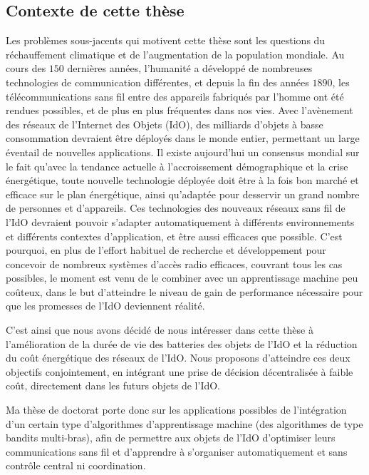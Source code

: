 \begin{resume_fr}
\section*{Contexte de cette thèse}


%
Les problèmes sous-jacents qui motivent cette thèse sont les questions du réchauffement climatique et de l'augmentation de la population mondiale.
Au cours des $150$ dernières années, l'humanité a développé de nombreuses technologies de communication différentes, et depuis la fin des années $1890$, les télécommunications sans fil entre des appareils fabriqués par l'homme ont été rendues possibles, et de plus en plus fréquentes dans nos vies.
Avec l'avènement des réseaux de l'Internet des Objets (IdO), des milliards d'objets à basse consommation devraient être déployés dans le monde entier, permettant un large éventail de nouvelles applications.
Il existe aujourd'hui un consensus mondial sur le fait qu'avec la tendance actuelle à l'accroissement démographique et la crise énergétique, toute nouvelle technologie déployée doit être à la fois bon marché et efficace sur le plan énergétique,
ainsi qu'adaptée pour desservir un grand nombre de personnes et d'appareils.
%
Ces technologies des nouveaux réseaux sans fil de l'IdO devraient pouvoir s'adapter automatiquement à différents environnements et différents contextes d'application, et être aussi efficaces que possible.
%
C'est pourquoi, en plus de l'effort habituel de recherche et développement pour concevoir de nombreux systèmes d'accès radio efficaces, couvrant tous les cas possibles,
le moment est venu de le combiner avec un apprentissage machine peu coûteux, dans le but d'atteindre le niveau de gain de performance nécessaire pour que les promesses de l'IdO deviennent réalité.


C'est ainsi que nous avons décidé de nous intéresser dans cette thèse à
l'amélioration de la durée de vie des batteries des objets de l'IdO et la réduction du coût énergétique des réseaux de l'IdO.
Nous proposons d'atteindre ces deux objectifs conjointement, en intégrant une prise de décision décentralisée à faible coût, directement dans les futurs objets de l'IdO.

Ma thèse de doctorat porte donc sur les applications possibles de l'intégration d'un certain type d'algorithmes d'apprentissage machine (des algorithmes de type bandits multi-bras), afin de permettre aux objets de l'IdO d'optimiser leurs communications sans fil et d'apprendre à s'organiser automatiquement et sans contrôle central ni coordination.



\end{resume_fr}
